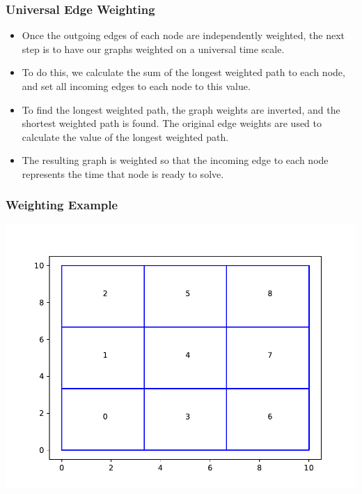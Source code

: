 \documentclass[xcolor={usenames,dvipsnames,svgnames,table}]{beamer}
\begin{document}
\begin{frame}[t]\frametitle{Universal Edge Weighting}
  \begin{block}{}
    \begin{itemize}
      \item Once the outgoing edges of each node are independently weighted, the next step is to have our graphs weighted on a universal time scale. 
      \item To do this, we calculate the sum of the longest weighted path to each node, and set all incoming edges to each node to this value.
      \item To find the longest weighted path, the graph weights are inverted, and the shortest weighted path is found. The original edge weights are used to calculate the value of the longest weighted path.
      \item The resulting graph is weighted so that the incoming edge to each node represents the time that node is ready to solve.
    \end{itemize}
  \end{block}
\end{frame}

\begin{frame}[t]\frametitle{Weighting Example}
  \centering
  \includegraphics[scale=0.6]{figures/subset_plot_2d.pdf}
\end{frame}
\end{document}
